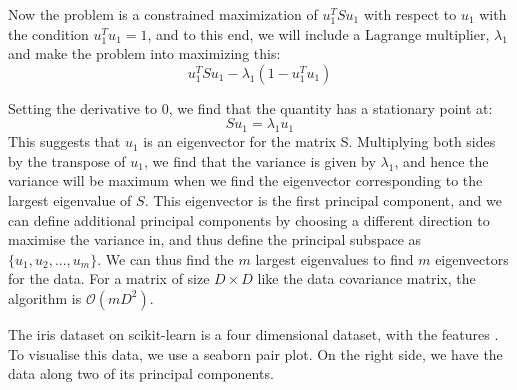 \documentclass{article}
\newcommand{\code}[1]{{\fontfamily{zi4} \selectfont{#1}}}
\begin{document}
Now the problem is a constrained maximization of $u_1^T S u_1$ with respect to $u_1$ with the condition $u_1^Tu_1=1$, and to this end, we will include a Lagrange multiplier, $\lambda_1$ and make the problem into maximizing this:
$$u_1^T S u_1 - \lambda_1 (1-u_1^Tu_1)$$

Setting the derivative to 0, we find that the quantity has a stationary point at:
$$Su_1=\lambda_1u_1$$
This suggests that $u_1$ is an eigenvector for the matrix S. Multiplying both sides by the transpose of $u_1$, we find that the variance is given by $\lambda_1$, and hence the variance will be maximum when we find the eigenvector corresponding to the largest eigenvalue of $S$. This eigenvector is the first principal component, and we can define additional principal components by choosing a different direction to maximise the variance in, and thus define the principal subspace as $\{ u_1, u_2, ..., u_m\}$. We can thus find the $m$ largest eigenvalues to find $m$ eigenvectors for the data. For a matrix of size $D \times D$ like the data covariance matrix, the algorithm is $\mathcal{O}(mD^2)$.

The iris dataset on scikit-learn is a four dimensional dataset, with the features \code{['sepal length', 'sepal width', 'petal length', 'petal width']}. To visualise this data, we use a seaborn pair plot. On the right side, we have the data along two of its principal components.
\end{document}
